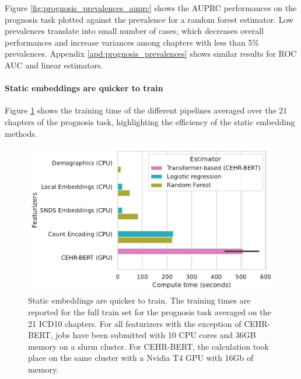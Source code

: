 \documentclass[french,12pt,twoside,a4paper]{book}
\begin{document}
Figure \ref{fig:prognosis_prevalences_auprc} shows the AUPRC
performances on the prognosis task plotted against the prevalence for a random
forest estimator. Low prevalences translate into small number of cases, which
decreases overall performances and increase variances among chapters with less
than 5\% prevalences. Appendix \ref{apd:prognosis_prevalences} shows similar
results for ROC AUC and linear estimators.


\paragraph{Static embeddings are quicker to train}%


Figure \ref{fig:prognosis_training_time} shows the training time of the
different pipelines averaged over the 21 chapters of the prognosis task,
highlighting the efficiency of the static embedding methods.

\begin{figure}[!h]
  \begin{minipage}{.35\linewidth}
    \caption{Static embeddings are quicker to train. The training times are
      reported for the full train set for the prognosis task averaged on the 21
      ICD10 chapters. For all featurizers with the exception of CEHR-BERT, jobs
      have been submitted with 10 CPU cores and 36GB memory on a slurm cluster. For
      CEHR-BERT, the calculation took place on the same cluster with a Nvidia T4
      GPU with 16Gb of memory.}\label{fig:prognosis_training_time}
  \end{minipage}%
  \hfill%
  \begin{minipage}{.62\linewidth}
    \includegraphics[width=\linewidth]{img/chapter_3/prognosis/training_testing_time_per_chapter.pdf}
  \end{minipage}
\end{figure}
\end{document}
